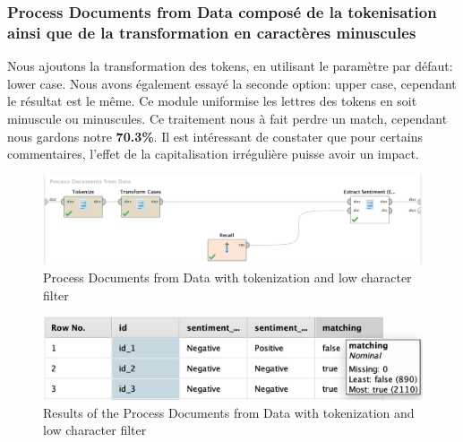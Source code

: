 \documentclass[a4paper]{article}
\begin{document}
\vspace{6pt}
\subsubsection{Process Documents from Data composé de la tokenisation ainsi que de la transformation en caractères minuscules}
Nous ajoutons la transformation des tokens, en utilisant le paramètre par défaut: lower case. Nous avons également essayé la seconde option: upper case, cependant le résultat est le même. Ce module uniformise les lettres des tokens en soit minuscule ou minuscules. Ce traitement nous à fait perdre un match, cependant nous gardons notre \textbf{70.3\%}. Il est intéressant de constater que pour certains commentaires, l'effet de la capitalisation irrégulière puisse avoir un impact.
\begin{figure}[H]
	\includegraphics[width=\linewidth]{imgs/part_3/3_processing_documents_no_stem_filter_token_stopword}
	\caption{Process Documents from Data with tokenization and low character filter}
	\label{fig:3_processing_documents_no_stem_filter_token_stopword}
\end{figure}
\begin{figure}[H]
	\includegraphics[width=\linewidth]{imgs/part_3/3_processing_documents_no_stem_filter_token_stopword_results}
	\caption{Results of the Process Documents from Data with tokenization and low character filter}
	\label{fig:3_processing_documents_no_stem_filter_token_stopword_results}
\end{figure}

\vspace{6pt}
\end{document}
